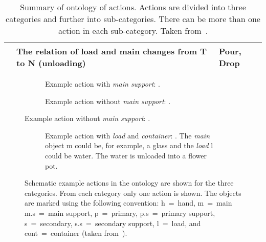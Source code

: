\begin{table}[]
\begin{tabular}{p{3cm} p{6cm} p{3cm}}
                & The relation of load and main changes from T to N  (unloading)    & Pour, Drop\\
    \bottomrule
  \end{tabular}
  \caption{Summary of ontology of actions. Actions are divided into three categories and further into sub-categories. There can be more than one action in each sub-category. Taken from~\textcite{reichaeinwoergoetter2018}.}
  \label{tab:sec_definitionofactions_ontologysummary}
\end{table}

\begin{figure}[]
  \begin{subfigure}[]{\textwidth}
    \centering
    
    \caption{Example action with \emph{main support}: .}
    \label{fig:sec_definitionofactions_actionscategory_1}
  \end{subfigure}
  \begin{subfigure}[]{\textwidth}
    \centering
    
    \caption{Example action without \emph{main support}: .}
    \label{fig:sec_definitionofactions_actionscategory_2}
  \end{subfigure}
\end{figure}
\begin{figure}[]\ContinuedFloat
  \begin{subfigure}[]{\textwidth}
    \centering
    
    \caption{Example action with \emph{load} and \emph{container}: . The \emph{main} object m could be, for example, a glass and the \emph{load} l could be water. The water is unloaded into a flower pot.}
    \label{fig:sec_definitionofactions_actionscategory_3}
  \end{subfigure}
  \caption{Schematic example actions in the ontology are shown for the three categories.
  From each category only one action is shown.
  The objects are marked using the following convention:
  h~=~hand, m~=~main m.s~=~main support, p~=~primary, p.s~=~primary support, s~=~secondary, s.s~=~secondary support, l~=~load, and cont~=~container (taken from~\textcite{reichaeinwoergoetter2018}).}
  \label{fig:sec_definitionofactions_ontologyactions}
\end{figure}
